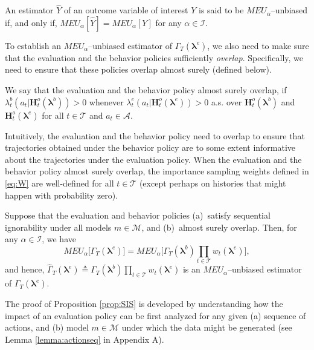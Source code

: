 \documentclass[opre,nonblindrev]{informs2}%
\newcommand{\teq}{\triangleq}
\newcommand{\1}{\hbox{\rm 1\kern-.35em 1}}
\newcommand{\MA}{\mathscr A}
\newcommand{\MT}{\mathscr T}
\newcommand{\MI}{\mathscr I}
\newcommand{\MM}{\mathscr M}
\newcommand{\blambda}{\boldsymbol{\lambda}}
\newcommand{\bH}{\mathbf{H}}
\begin{document}
\begin{definition}\label{def:unbias}
An estimator $\hat Y$ of an outcome variable of interest $Y$  is said to be $MEU_\alpha$--unbiased if, and only if, $MEU_\alpha[\hat Y]=MEU_\alpha[Y]$ for any $\alpha\in\MI$.
\end{definition}

To establish an $MEU_\alpha$--unbiased estimator of  $\Gamma_T(\blambda^e)$,  we also need to make sure that the evaluation and the behavior policies sufficiently {\em overlap}. Specifically, we need to ensure that these policies overlap almost surely (defined below).


\begin{definition} We say that the evaluation and the behavior policy almost surely overlap, if ${\lambda_t^b(a_t|\bH^o_t (\blambda^b))}>0$ whenever ${\lambda_t^e(a_t|\bH^o_t (\blambda^e))}>0$ a.s. over $\bH^o_t(\blambda^b)$ and $\bH^o_t(\blambda^e)$ for all $t\in\MT$ and $a_t\in\MA$.
\end{definition}

Intuitively, the evaluation and the behavior policy need to overlap to ensure that trajectories obtained under the behavior policy are to some extent informative about the trajectories under the evaluation policy. When the evaluation and the behavior policy almost surely overlap, the importance sampling weights defined in \eqref{eq:W} are well-defined for all $t\in\MT$ (except perhaps on histories that might happen with probability zero).





\begin{proposition}\label{prop:SIS} Suppose that the evaluation and behavior policies (a)~satisfy sequential ignorability under all models $m\in\MM$, and (b)~almost surely overlap. Then,  for any  $\alpha\in\MI$, we have
\begin{equation}\label{prop:SISADTR}
MEU_\alpha\big[\Gamma_T(\blambda^e)\big]=MEU_\alpha\big[\Gamma_T(\blambda^b) \prod_{t\in\MT} w_t(\blambda^e)\big],
\end{equation}
and hence, $\hat \Gamma_T(\blambda^e)\teq \Gamma_T(\blambda^b) \prod_{t\in\MT} w_t(\blambda^e)$ is an $MEU_\alpha$--unbiased estimator of  $\Gamma_T(\blambda^e)$.
\end{proposition}


The proof of Proposition \ref{prop:SIS} is developed by understanding how the impact of an evaluation policy can  be first analyzed for any given (a) sequence of actions, and (b) model $m\in\MM$ under which the data might be generated (see Lemma \ref{lemma:actionseq} in Appendix A).
\end{document}
